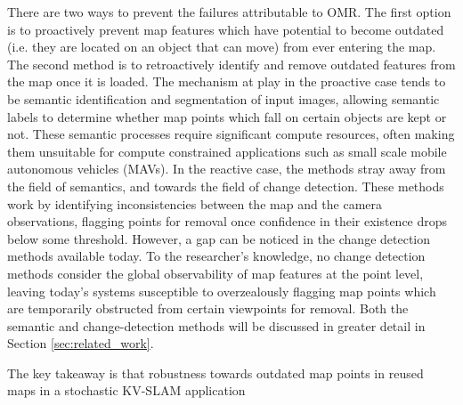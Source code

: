 There are two ways to prevent the failures attributable to OMR. The first option is to proactively prevent map features which have potential to become outdated (i.e. they are located on an object that can move) from ever entering the map. The second method is to retroactively identify and remove outdated features from the map once it is loaded. The mechanism at play in the proactive case tends to be semantic identification and segmentation of input images, allowing semantic labels to determine whether map points which fall on certain objects are kept or not. These semantic processes require significant compute resources, often making them unsuitable for compute constrained applications such as small scale mobile autonomous vehicles (MAVs). In the reactive case, the methods stray away from the field of semantics, and towards the field of change detection. These methods work by identifying inconsistencies between the map and the camera observations, flagging points for removal once confidence in their existence drops below some threshold. However, a gap can be noticed in the change detection methods available today. To the researcher's knowledge, no change detection methods consider the global observability of map features at the point level, leaving today's systems susceptible to overzealously flagging map points which are temporarily obstructed from certain viewpoints for removal. Both the semantic and change-detection methods will be discussed in greater detail in Section \ref{sec:related_work}.

The key takeaway is that robustness towards outdated map points in reused maps in a stochastic KV-SLAM application

